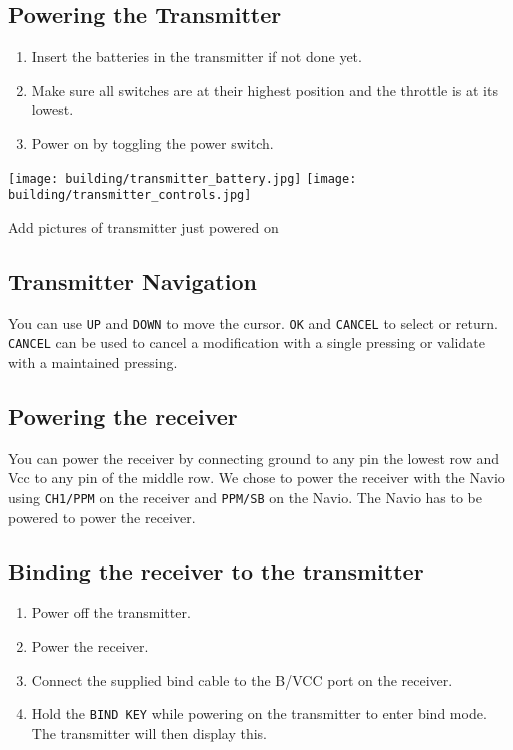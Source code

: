         \subsection{Powering the Transmitter}
            \begin{enumerate}
                \item Insert the batteries in the transmitter if not done yet.
                \item Make sure all switches are at their highest position and the throttle is at its lowest.
                \item Power on by toggling the power switch.
            \end{enumerate}

            \texttt{[image: building/transmitter\_battery.jpg]}
            \texttt{[image: building/transmitter\_controls.jpg]}
            
            {\color{blue} Add pictures of transmitter just powered on}
            
        \subsection{Transmitter Navigation}
            You can use \texttt{UP} and \texttt{DOWN} to move the cursor.
            \texttt{OK} and \texttt{CANCEL} to select or return.
            \texttt{CANCEL} can be used to cancel a modification with a single pressing or validate with a maintained pressing.
            
        \subsection{Powering the receiver}
            You can power the receiver by connecting ground to any pin the lowest row and Vcc to any pin of the middle row.
            We chose to power the receiver with the Navio using \texttt{CH1/PPM} on the receiver and \texttt{PPM/SB} on the Navio. The Navio has to be powered to power the receiver.
        
        \subsection{Binding the receiver to the transmitter}
            \begin{enumerate}
                \item Power off the transmitter.
                \item Power the receiver.
                \item Connect the supplied bind cable to the B/VCC port on the receiver.
                \item Hold the \texttt{BIND KEY} while powering on the transmitter to enter bind mode. The transmitter will then display this.
            \end{enumerate}
            

